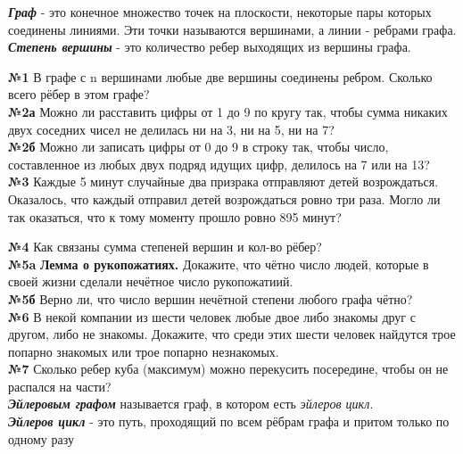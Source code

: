 \documentclass[12 pt, a4paper]{article}%
\newcommand{\task}[1]{{{\vspace{0.6cm} \vspace{-2ex} \textbf{№{#1}}  }}}
\begin{document}
	\large
	\raggedright
	\textbf{\textit{Граф}} - это конечное множество точек на плоскости, некоторые
	пары которых соединены линиями. Эти точки называются вершинами, а линии -
	ребрами графа.\\
	\textbf{\textit{Степень вершины}} - это количество ребер выходящих из вершины графа.

	\task{1} В графе с  n вершинами любые две вершины соединены ребром. Сколько
	всего рёбер в этом графе?\\
	\task{2а} Можно ли расставить цифры от 1 до 9 по кругу так, чтобы сумма никаких двух
	соседних чисел не делилась ни на 3, ни на 5, ни на 7?\\
	\vspace{-1ex}
	\task{2б}Можно ли записать цифры от 0 до 9 в строку так, чтобы число, составленное
	из любых двух подряд идущих цифр, делилось на 7 или на 13?\\
	
	\task{3}Каждые 5 минут случайные два призрака отправляют детей возрождаться.
	 Оказалось, что каждый отправил детей возрождаться ровно три раза. Могло ли так оказаться, что к тому моменту прошло ровно 895 минут?
	
	\task{4} Как связаны сумма степеней вершин и кол-во рёбер?\\
	
	\task{5a} \textbf{Лемма о рукопожатиях.} Докажите, что чётно число людей, которые в своей
	жизни сделали нечётное число рукопожатиий.\\
	
	\task{5б} Верно ли, что число вершин нечётной степени любого графа чётно?\\
	
	\task{6} В некой компании из шести человек любые двое либо знакомы друг с другом, либо не
	знакомы. Докажите, что среди этих шести человек найдутся трое попарно знакомых или трое попарно незнакомых.\\
	
	\task{7} Сколько ребер куба (максимум) можно перекусить посередине, чтобы
	он не распался на части?\\
	
	\textit{\textbf{Эйлеровым графом}} называется граф, в котором есть \textit{эйлеров цикл}.\\
	\textbf{\textit{Эйлеров цикл}} - это путь, проходящий по всем рёбрам графа и притом только по одному разу\\
	
	\newpage
	
\end{document}
